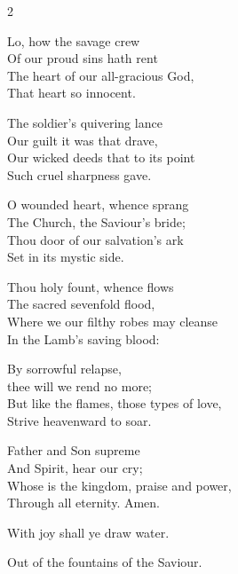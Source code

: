\documentclass[12pt]{book}
\begin{document}
\begin{multicols}{2}
\begin{enpars}
\raggedcolumns
Lo, how the savage crew\\
Of our proud sins hath rent\\
The heart of our all-gracious God,\\
That heart so innocent.

The soldier's quivering lance\\
Our guilt it was that drave,\\
Our wicked deeds that to its point\\
Such cruel sharpness gave.

O wounded heart, whence sprang\\
The Church, the Saviour's bride;\\
Thou door of our salvation's ark\\
Set in its mystic side.

Thou holy fount, whence flows\\
The sacred sevenfold flood,\\
Where we our filthy robes may cleanse\\
In the Lamb's saving blood:

By sorrowful relapse,\\
thee will we rend no more;\\
But like the flames, those types of love,\\
Strive heavenward to soar.

Father and Son supreme\\
And Spirit, hear our cry;\\
Whose is the kingdom, praise and power,\\
Through all eternity.
Amen.

\end{enpars}
\end{multicols}


\label{haurietis}
   
\begin{enpars}
\noindent \vv With joy shall ye draw water.

\noindent \rr Out of the fountains of the Saviour.

\end{enpars}
\myrule
\end{document}
